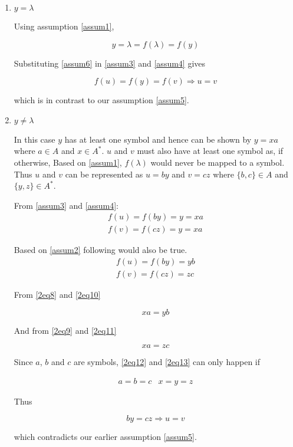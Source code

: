 \begin{enumerate}[label=(\alph*)]

	\item
	$y = \lambda$

	Using assumption \eqref{assum1},

	\begin{equation}\label{assum6}
	y=\lambda=f(\lambda)=f(y)
	\end{equation}

	Substituting \eqref{assum6} in \eqref{assum3} and \eqref{assum4} gives

	\begin{equation}
	f(u) = f(y) = f(v) \Rightarrow u = v
	\end{equation}

	which is in contrast to our assumption \eqref{assum5}.

	\item
	$y \neq \lambda$

	In this case $y$ has at least one symbol and hence can be shown by $y=xa$ where $a \in A$ and $x \in A^*$.
	$u$ and $v$ must also have at least one symbol as, if otherwise, Based on \eqref{assum1}, $f(\lambda)$ would never be mapped to a symbol.
	Thus $u$ and $v$ can be represented as $u = by$ and $v = cz$ where $\{b,c\}\in A$ and $\{y,z\}\in A^*$.

	From \eqref{assum3} and \eqref{assum4}:
	\begin{eqnarray}
	f(u) = f(by) = y = xa \label{2eq8}\\
	f(v) = f(cz) = y = xa \label{2eq9}
	\end{eqnarray}

	Based on \eqref{assum2} following would also be true.
	\begin{eqnarray}
	f(u) = f(by) = yb \label{2eq10}\\
	f(v) = f(cz) = zc \label{2eq11}
	\end{eqnarray}

	From \eqref{2eq8} and \eqref{2eq10}

	\begin{equation}\label{2eq12}
	xa = yb
	\end{equation}

	And from \eqref{2eq9} and \eqref{2eq11}

	\begin{equation}\label{2eq13}
	xa = zc
	\end{equation}

	Since $a$, $b$ and $c$ are symbols, \eqref{2eq12} and \eqref{2eq13} can only happen if

	\begin{eqnarray}
	a = b = c & x = y = z
	\end{eqnarray}

	Thus

	\begin{equation}
	by = cz \Rightarrow u = v
	\end{equation}

	which contradicts our earlier assumption \eqref{assum5}.

\end{enumerate}

